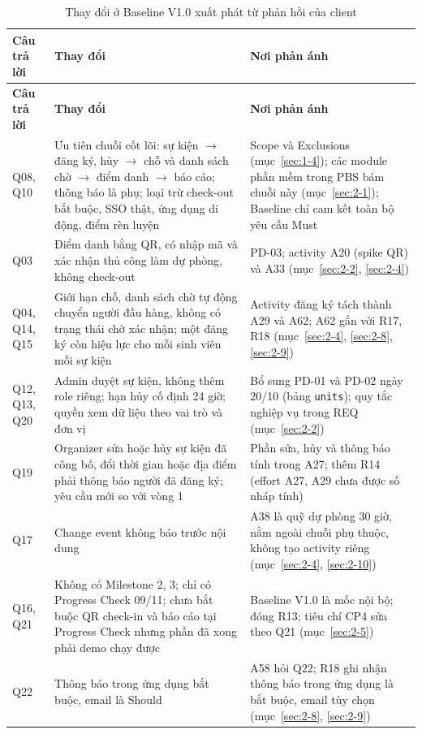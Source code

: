 \begingroup\tblsetup\tblzebra
\begin{longtable}{L{1.9cm}L{4.6cm}L{5.6cm}}
\caption{Thay đổi ở Baseline V1.0 xuất phát từ phản hồi của client}\label{tab:client-impact}\\
\toprule
{}\textbf{Câu trả lời} & \textbf{Thay đổi} & \textbf{Nơi phản ánh} \\
\midrule
\endfirsthead
\toprule
{}\textbf{Câu trả lời} & \textbf{Thay đổi} & \textbf{Nơi phản ánh} \\
\midrule
\endhead
\bottomrule
\endlastfoot
Q08, Q10 & Ưu tiên chuỗi cốt lõi: sự kiện $\rightarrow$ đăng ký, hủy $\rightarrow$ chỗ và danh sách chờ $\rightarrow$ điểm danh $\rightarrow$ báo cáo; thông báo là phụ; loại trừ check-out bắt buộc, SSO thật, ứng dụng di động, điểm rèn luyện & Scope và Exclusions (mục~\ref{sec:1-4}); các module phần mềm trong PBS bám chuỗi này (mục~\ref{sec:2-1}); Baseline chỉ cam kết toàn bộ yêu cầu Must \\
Q03 & Điểm danh bằng QR, có nhập mã và xác nhận thủ công làm dự phòng, không check-out & PD-03; activity A20 (spike QR) và A33 (mục~\ref{sec:2-2}, \ref{sec:2-4}) \\
Q04, Q14, Q15 & Giới hạn chỗ, danh sách chờ tự động chuyển người đầu hàng, không có trạng thái chờ xác nhận; một đăng ký còn hiệu lực cho mỗi sinh viên mỗi sự kiện & Activity đăng ký tách thành A29 và A62; A62 gắn với R17, R18 (mục~\ref{sec:2-4}, \ref{sec:2-8}, \ref{sec:2-9}) \\
Q12, Q13, Q20 & Admin duyệt sự kiện, không thêm role riêng; hạn hủy cố định 24 giờ; quyền xem dữ liệu theo vai trò và đơn vị & Bổ sung PD-01 và PD-02 ngày 20/10 (bảng \texttt{units}); quy tắc nghiệp vụ trong REQ (mục~\ref{sec:2-2}) \\
Q19 & Organizer sửa hoặc hủy sự kiện đã công bố, đổi thời gian hoặc địa điểm phải thông báo người đã đăng ký; yêu cầu mới so với vòng 1 & Phần sửa, hủy và thông báo tính trong A27; thêm R14 (effort A27, A29 chưa được số nháp tính) \\
Q17 & Change event không báo trước nội dung & A38 là quỹ dự phòng 30 giờ, nằm ngoài chuỗi phụ thuộc, không tạo activity riêng (mục~\ref{sec:2-4}, \ref{sec:2-10}) \\
Q16, Q21 & Không có Milestone 2, 3; chỉ có Progress Check 09/11; chưa bắt buộc QR check-in và báo cáo tại Progress Check nhưng phần đã xong phải demo chạy được & Baseline V1.0 là mốc nội bộ; đóng R13; tiêu chí CP4 sửa theo Q21 (mục~\ref{sec:2-5}) \\
Q22 & Thông báo trong ứng dụng bắt buộc, email là Should & A58 hỏi Q22; R18 ghi nhận thông báo trong ứng dụng là bắt buộc, email tùy chọn (mục~\ref{sec:2-8}, \ref{sec:2-9}) \\
\end{longtable}
\endgroup

